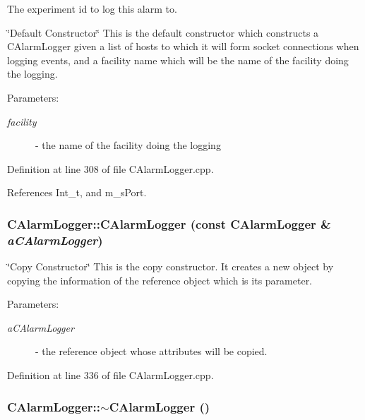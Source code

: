 The experiment id to log this alarm to.

\char`\"{}Default Constructor\char`\"{} This is the default constructor which constructs a CAlarm\-Logger given a list of hosts to which it will form socket connections when logging events, and a facility name which will be the name of the facility doing the logging.\begin{Desc}
\item[Parameters: ]\par
\begin{description}
\item[{\em 
facility}]- the name of the facility doing the logging \end{description}
\end{Desc}


Definition at line 308 of file CAlarm\-Logger.cpp.

References Int\_\-t, and m\_\-s\-Port.
\subsubsection{\setlength{\rightskip}{0pt plus 5cm}CAlarm\-Logger::CAlarm\-Logger (const CAlarm\-Logger \& {\em a\-CAlarm\-Logger})}\label{classCAlarmLogger_a1}


\char`\"{}Copy Constructor\char`\"{} This is the copy constructor. It creates a new object by copying the information of the reference object which is its parameter.\begin{Desc}
\item[Parameters: ]\par
\begin{description}
\item[{\em 
a\-CAlarm\-Logger}]- the reference object whose attributes will be copied. \end{description}
\end{Desc}


Definition at line 336 of file CAlarm\-Logger.cpp.
\subsubsection{\setlength{\rightskip}{0pt plus 5cm}CAlarm\-Logger::$\sim$CAlarm\-Logger ()}\label{classCAlarmLogger_a2}


